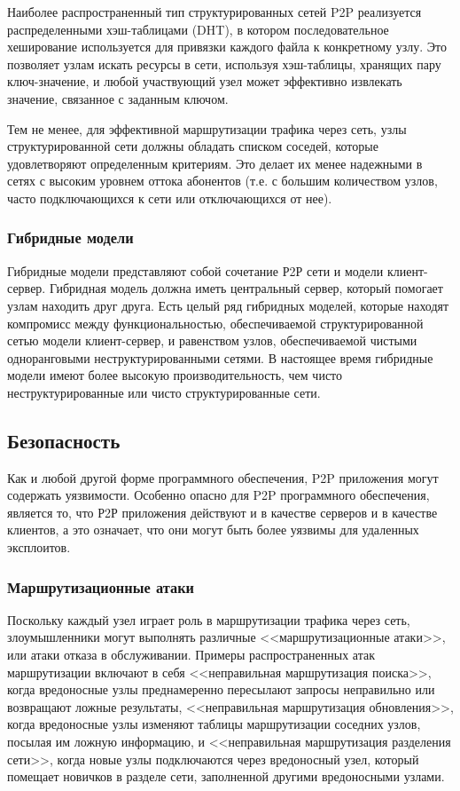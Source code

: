 \documentclass[bachelor, och, coursework]{SCWorks}
\begin{document}
Наиболее распространенный тип структурированных сетей P2P реализуется распределенными хэш-таблицами (DHT), в котором последовательное хеширование используется для привязки каждого файла к конкретному узлу. Это позволяет узлам искать ресурсы в сети, используя хэш-таблицы, хранящих пару ключ-значение, и любой участвующий узел может эффективно извлекать значение, связанное с заданным ключом.

Тем не менее, для эффективной маршрутизации трафика через сеть, узлы структурированной сети должны обладать списком соседей, которые удовлетворяют определенным критериям. Это делает их менее надежными в сетях с высоким уровнем оттока абонентов (т.е. с большим количеством узлов, часто подключающихся к сети или отключающихся от нее).

\subsubsection{Гибридные модели}
Гибридные модели представляют собой сочетание Р2Р сети и модели клиент-сервер. Гибридная модель должна иметь центральный сервер, который помогает узлам находить друг друга. Есть целый ряд гибридных моделей, которые находят компромисс между функциональностью, обеспечиваемой структурированной сетью модели клиент-сервер, и равенством узлов, обеспечиваемой чистыми одноранговыми неструктурированными сетями. В настоящее время гибридные модели имеют более высокую производительность, чем чисто неструктурированные или чисто структурированные сети.

\subsection{Безопасность}
Как и любой другой форме программного обеспечения, P2P приложения могут содержать уязвимости. Особенно опасно для P2P программного обеспечения, является то, что Р2Р приложения действуют и в качестве серверов и в качестве клиентов, а это означает, что они могут быть более уязвимы для удаленных эксплоитов.

\subsubsection{Маршрутизационные атаки}
Поскольку каждый узел играет роль в маршрутизации трафика через сеть, злоумышленники могут выполнять различные <<маршрутизационные атаки>>, или атаки отказа в обслуживании. Примеры распространенных атак маршрутизации включают в себя <<неправильная маршрутизация поиска>>, когда вредоносные узлы преднамеренно пересылают запросы неправильно или возвращают ложные результаты, <<неправильная маршрутизация обновления>>, когда вредоносные узлы изменяют таблицы маршрутизации соседних узлов, посылая им ложную информацию, и <<неправильная маршрутизация разделения сети>>, когда новые узлы подключаются через вредоносный узел, который помещает новичков в разделе сети, заполненной другими вредоносными узлами.
\end{document}
